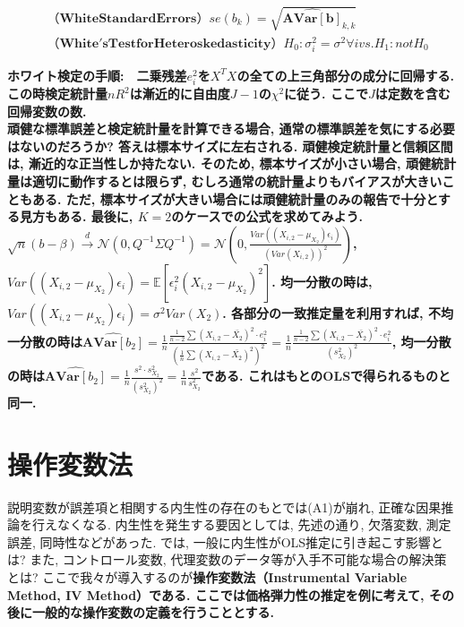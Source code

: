 \documentclass[paper=a4paper,fontsize=10pt]{jlreq}
\begin{document}
\begin{align*}
  &\mathbf{（White Standard Errors）}　se(b_k)=\sqrt{\hat{\mathbf{\text{AVar}}[\mathbf{b}]}_{k,k}}\\
  &\mathbf{（White'sTestforHeteroskedasticity）}　H_0: \sigma_i^2=\sigma^2 \forall i　vs.　H_1: not　H_0
\end{align*}

\rmfamily\mcfamily\bfseries{ホワイト検定の手順}\mdseries :　二乗残差$e_i^2$を$X^T X$の全ての上三角部分の成分に回帰する. この時検定統計量$nR^2$は漸近的に自由度$J-1$の$\chi^2$に従う. ここで$J$は定数を含む回帰変数の数.\\

頑健な標準誤差と検定統計量を計算できる場合, 通常の標準誤差を気にする必要はないのだろうか? 答えは標本サイズに左右される. 頑健検定統計量と信頼区間は, 漸近的な正当性しか持たない. そのため, 標本サイズが小さい場合, 頑健統計量は適切に動作するとは限らず, むしろ通常の統計量よりもバイアスが大きいこともある. ただ, 標本サイズが大きい場合には頑健統計量のみの報告で十分とする見方もある. 最後に, $K=2$のケースでの公式を求めてみよう. $\sqrt{n}({b}-\beta) \overset{d}{\to} \mathcal{N}({0}, Q^{-1}\Sigma Q^{-1}) = \mathcal{N}({0}, \frac{Var((X_{i,2}-\mu_{X_2})\epsilon_i)}{(Var(X_{i,2}))^2})$, $Var((X_{i,2}-\mu_{X_2})\epsilon_i)=\mathbb{E}[\epsilon_i^2(X_{i,2}-\mu_{X_2})^2]$. 均一分散の時は, $Var((X_{i,2}-\mu_{X_2})\epsilon_i)=\sigma^2 Var(X_2)$. 各部分の一致推定量を利用すれば, 不均一分散の時は$\hat{\mathbf{\text{AVar}}[b_2]}=\frac{1}{n}\frac{\frac{1}{n-2}\sum(X_{i,2}-\bar{X_2})^2\cdot e_i^2}{(\frac{1}{n}\sum(X_{i,2}-\bar{X_2})^2)^2} = \frac{1}{n}\frac{\frac{1}{n-2}\sum(X_{i,2}-\bar{X_2})^2\cdot e_i^2}{(s_{X_2}^2)^2}$, 均一分散の時は$\hat{\mathbf{\text{AVar}}[b_2]} = \frac{1}{n}\frac{s^2\cdot s_{X_2}^2}{(s_{X_2}^2)^2} = \frac{1}{n}\frac{s^2}{s_{X_2}^2}$である. これはもとのOLSで得られるものと同一.\\

\section{操作変数法}
説明変数が誤差項と相関する内生性の存在のもとでは(A1)が崩れ, 正確な因果推論を行えなくなる. 内生性を発生する要因としては, 先述の通り, 欠落変数, 測定誤差, 同時性などがあった. では, 一般に内生性がOLS推定に引き起こす影響とは? また, コントロール変数, 代理変数のデータ等が入手不可能な場合の解決策とは? ここで我々が導入するのが\rmfamily\mcfamily\bfseries{操作変数法（Instrumental Variable Method, IV Method）}\mdseries である. ここでは価格弾力性の推定を例に考えて, その後に一般的な操作変数の定義を行うこととする.\\
\end{document}
